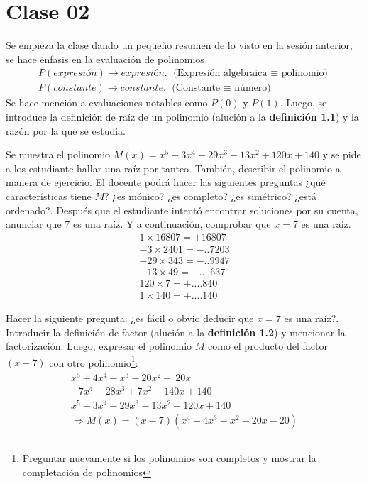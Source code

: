 \section{Clase 02}
{
    Se empieza la clase dando un pequeño resumen de lo visto en la sesión anterior, se hace énfasis en la evaluación de polinomios
    \begin{gather*}
        P(expresión) \rightarrow expresión.\mbox{ (Expresión algebraica $\equiv$ polinomio)}\\
        P(constante) \rightarrow constante.\mbox{ (Constante $\equiv$ número)}
    \end{gather*}
    Se hace mención a evaluaciones notables como $P(0)$ y $P(1)$. Luego, se introduce la definición de raíz de un polinomio (alución a la \textbf{definición 1.1}) y la razón por la que se estudia.

Se muestra el polinomio $M(x) = x^5 - 3x^4 - 29x^3 - 13x^2 + 120x + 140$ y se pide a los estudiante hallar una raíz por tanteo.
También, describir el polinomio a manera de ejercicio. El docente podrá hacer las siguientes preguntas ¿qué características tiene $M$? ¿es mónico? ¿es completo? ¿es simétrico? ¿está ordenado?.
Después que el estudiante intentó encontrar soluciones por su cuenta, anunciar que 7 es una raíz. Y a continuación, comprobar que $x = 7$ es una raíz.
    \begin{align*}
        1\times 16807= +16807\\
        -3\times 2401 = -\mbox{..}7203\\
        -29\times 343  = -\mbox{..}9947\\
        -13\times 49   = -\mbox{....}637\\
        120\times 7    = +\mbox{....}840\\
        1\times 140  = +\mbox{....}140
    \end{align*}

    Hacer la siguiente pregunta: ¿es fácil o obvio deducir que $x = 7$ es una raíz?.
Introducir la definición de factor (alución a la \textbf{definición 1.2}) y mencionar la factorización.
Luego, expresar el polinomio $M$ como el producto del factor $(x - 7)$ con otro polinomio\footnote{Preguntar nuevamente si los polinomios son completos y mostrar la completación de polinomios}:
    \begin{align*}
        x^5 + 4x^4 - x^3 - 20x^2 - \:20x \hspace{3em}\\
        - 7x^4 - 28x^3 + 7x^2 + 140x + 140\\
        x^5 - 3x^4 - 29x^3 - 13x^2 + 120x + 140\\
        \Rightarrow M(x) = (x - 7)(x^4 + 4x^3 - x^2 - 20x - 20)
    \end{align*}

}
